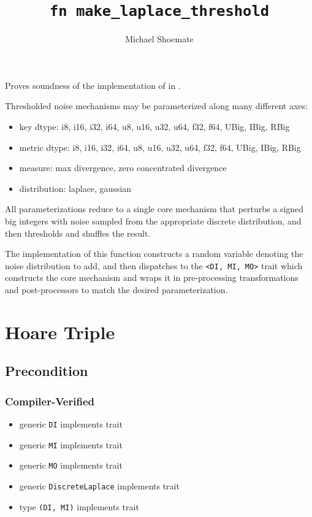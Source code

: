 \documentclass{article}
\title{\texttt{fn make\_laplace\_threshold}}
\author{Michael Shoemate}
\date{}
\begin{document}
\maketitle

\contrib
Proves soundness of the implementation of  in .

Thresholded noise mechanisms may be parameterized along many different axes:
\begin{itemize}
    \item key dtype: i8, i16, i32, i64, u8, u16, u32, u64, f32, f64, UBig, IBig, RBig
    \item metric dtype: i8, i16, i32, i64, u8, u16, u32, u64, f32, f64, UBig, IBig, RBig
    \item measure: max divergence, zero concentrated divergence
    \item distribution: laplace, gaussian
\end{itemize}

All parameterizations reduce to a single core mechanism that perturbs
a signed big integers with noise sampled from the appropriate discrete distribution,
and then thresholds and shuffles the result.

The implementation of this function constructs a random variable denoting the noise distribution to add, 
and then dispatches to the \texttt{<DI, MI, MO>} trait
which constructs the core mechanism and wraps it in pre-processing transformations and post-processors to match the desired parameterization.

\section{Hoare Triple}
\subsection*{Precondition}
\subsubsection*{Compiler-Verified}
\begin{itemize}
    \item generic \texttt{DI} implements trait 
    \item generic \texttt{MI} implements trait 
    \item generic \texttt{MO} implements trait 
    \item generic \texttt{DiscreteLaplace} implements trait 
    \item type \texttt{(DI, MI)} implements trait 
\end{itemize}
\end{document}
